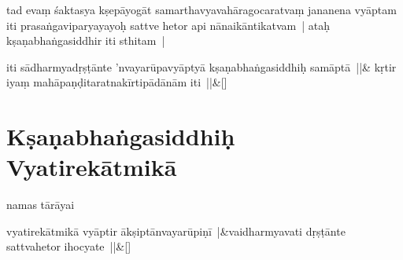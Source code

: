 \documentclass[article,12pt,a4paper]{memoir}%
\newcounter{parCount}
\begin{document}
	  
	  \pstart \leavevmode%
	\label{thakur75-82.12}tad evaṃ śaktasya kṣepāyogāt samarthavyavahāragocaratvaṃ jananena vyāptam iti prasaṅgaviparyayayoḥ sattve hetor api nānaikāntikatvam | ataḥ kṣaṇabhaṅgasiddhir iti sthitam |
	{}
	\pend%
      
	    
	    \stanza[\smallbreak]
	  \label{thakur75-82.15} iti sādharmyadṛṣṭānte 'nvayarūpavyāptyā kṣaṇabhaṅgasiddhiḥ samāptā ||&\label{thakur75-82.17} kṛtir iyaṃ mahāpaṇḍitaratnakīrtipādānām iti ||\&[\smallbreak]
	  
	  
	  
	    
	    \endnumbering%
	    
	  
	  
	
	    
	    \beginnumbering%
	    
	  
\chapter[{Kṣaṇabhaṅgasiddhiḥ Vyatirekātmikā}][{Kṣaṇabhaṅgasiddhiḥ Vyatirekātmikā}]{Kṣaṇabhaṅgasiddhiḥ Vyatirekātmikā}\label{Kṣaṇabhaṅgasiddhiḥ_Vyatirekātmikā}

	  
	  \pstart \leavevmode%
	\hphantom{.}\label{thakur75-83.5}namas tārāyai 
	    \pend%
	  
	    
	    \stanza[\smallbreak]
	  \label{thakur75-83.6}vyatirekātmikā vyāptir ākṣiptānvayarūpiṇī |&vaidharmyavati dṛṣṭānte sattvahetor ihocyate ||\&[\smallbreak]
	  
	  
	  
\end{document}
